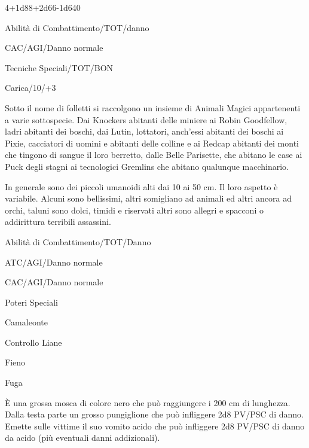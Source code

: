  {4+1d8}{8+2d6}{6-1d6}{40}

\begin{parmostro}{Abilit\`a di Combattimento/TOT/danno}
\item CAC/AGI/Danno normale
\end{parmostro}

\begin{parmostro}{Tecniche Speciali/TOT/BON}
\item Carica/10/+3
\end{parmostro}


Sotto il nome di folletti si raccolgono un insieme di Animali Magici
appartenenti a varie sottospecie. Dai Knockers abitanti delle miniere
ai Robin Goodfellow, ladri abitanti dei boschi, dai Lutin, lottatori,
anch'essi abitanti dei boschi ai Pixie, cacciatori di uomini e
abitanti delle colline e ai Redcap abitanti dei monti che tingono di
sangue il loro berretto, dalle Belle Parisette, che abitano le case ai
Puck degli stagni ai tecnologici Gremlins che abitano qualunque
macchinario.

In generale sono dei piccoli umanoidi alti dai 10 ai 50 cm. Il loro
aspetto \`e variabile. Alcuni sono bellissimi, altri somigliano ad
animali ed altri ancora ad orchi, taluni sono dolci, timidi e
riservati altri sono allegri e spacconi o addirittura terribili
assassini. 


\begin{parmostro}{Abilit\`a di Combattimento/TOT/Danno}
\item ATC/AGI/Danno normale
\item CAC/AGI/Danno normale
\end{parmostro}

\begin{parmostro}{Poteri Speciali}
\item Camaleonte
\item Controllo Liane
\item Fieno
\item Fuga
\end{parmostro}


\`E una grossa mosca di colore nero che pu\`o raggiungere i 200 cm di
lunghezza. Dalla testa parte un grosso pungiglione che pu\`o
infliggere 2d8 PV/PSC di danno. Emette sulle vittime il suo vomito
acido che pu\`o infliggere 2d8 PV/PSC di danno da acido (pi\`u
eventuali danni addizionali). 

